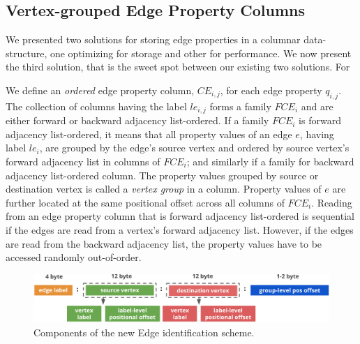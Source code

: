 \subsection{Vertex-grouped Edge Property Columns}

We presented two solutions for storing edge properties in a columnar data-structure, one optimizing for storage and other for performance. We now present the third solution, that is the sweet spot between our existing two solutions. For


We define an \emph{ordered} edge property column, $CE_{i,j}$, for each edge property $q_{i,j}$. The collection of columns having the label $le_{i,j}$ forms a family $FCE_i$ and are either forward or backward adjacency list-ordered. If a family $FCE_i$ is forward adjacency list-ordered, it means that all property values of an edge $e$, having label $le_i$, are grouped by the edge's source vertex and ordered by source vertex's forward adjacency list in columns of $FCE_i$; and similarly if a family for backward adjacency list-ordered column. The property values grouped by source or destination vertex is called a \emph{vertex group} in a column. Property values of $e$ are further located at the same positional offset across all columns of $FCE_i$. Reading from an edge property column that is forward adjacency list-ordered is sequential if the edges are read from a vertex's forward adjacency list. However, if the edges are read from the backward adjacency list, the property values have to be accessed randomly out-of-order.

\begin{figure}
	\vspace{-25pt}
	\hfill\includegraphics[scale=0.78]{img/edge-scheme}\hspace*{\fill}
	\captionsetup{justification=centering}
	\caption{Components of the new Edge identification scheme.}
	\label{fig:edge-scheme}
	\vspace{5pt}
\end{figure}


